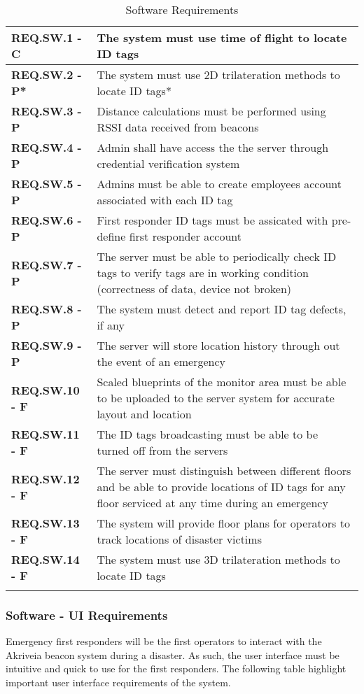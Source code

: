 \bgroup
\def\arraystretch{1.5}
\begin{longtable}[H]{ | m{3.5cm} | m{12.5cm} |} 
 \hline
 \textbf{REQ.SW.1 - C} & The system must use time of flight to locate ID tags \\ 
\hline
 \textbf{REQ.SW.2 - P*} & The system must use 2D trilateration methods to locate ID tags* \\ 
\hline
 \textbf{REQ.SW.3 - P} & Distance calculations must be performed using RSSI data received from beacons \\ 
\hline
 \textbf{REQ.SW.4 - P} & Admin shall have access the the server through credential verification system \\
\hline
 \textbf{REQ.SW.5 - P} & Admins must be able to create employees account associated with each ID tag \\
\hline
 \textbf{REQ.SW.6 - P} & First responder ID tags must be assicated with pre-define first responder account \\
\hline
 \textbf{REQ.SW.7 - P} & The server must be able to periodically check ID tags to verify tags are in working condition (correctness of data, device not broken) \\
\hline
 \textbf{REQ.SW.8 - P} & The system must detect and report ID tag defects, if any \\
\hline
 \textbf{REQ.SW.9 - P} & The server will store location history through out the event of an emergency \\
\hline
 \textbf{REQ.SW.10 - F} & Scaled blueprints of the monitor area must be able to be uploaded to the server system for accurate layout and location \\
\hline
 \textbf{REQ.SW.11 - F} & The ID tags broadcasting must be able to be turned off from the servers \\
\hline
 \textbf{REQ.SW.12 - F} & The server must distinguish between different floors and be able to provide locations of ID tags for any floor serviced at any time during an emergency \\
\hline
 \textbf{REQ.SW.13 - F} & The system will provide floor plans for operators to track locations of disaster victims \\
\hline
 \textbf{REQ.SW.14 - F} & The system must use 3D trilateration methods to locate ID tags \\
\hline
\caption{Software Requirements}
\end{longtable}	

\break
\subsubsection{Software - UI Requirements}
Emergency first responders will be the first operators to interact with the Akriveia beacon system during a disaster. As such, the user interface must be intuitive and quick to use for the first responders. The following table highlight important user interface requirements of the system.
\bigskip

